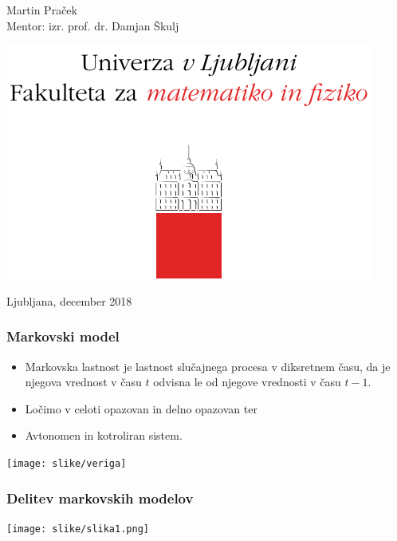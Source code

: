 \documentclass{beamer} %
\begin{document}
\begin{frame} 
\begin{titlepage}
	\begin{center}
		\vspace*{1cm}
		Martin Praček \\
		Mentor: izr. prof. dr. Damjan Škulj
		
		\vspace{3cm}
		\includegraphics[scale=1]{slike/logo}
		
		
		\vfill
		
		\large Ljubljana, december 2018
		
	\end{center}
\end{titlepage}
\end{frame}


\begin{frame} 
\frametitle{Markovski model}
\begin{itemize}
	\item Markovska lastnost je lastnost slučajnega procesa v diksretnem času, da je njegova vrednost v času $t$ odvisna le od njegove vrednosti v času $t-1$.
	\item Ločimo v celoti opazovan in delno opazovan ter
	\item Avtonomen in kotroliran sistem.
\end{itemize}
\texttt{[image: slike/veriga]}
\end{frame}


\begin{frame}
\frametitle{Delitev markovskih modelov}
\texttt{[image: slike/slika1.png]}
\end{frame}
\end{document}
